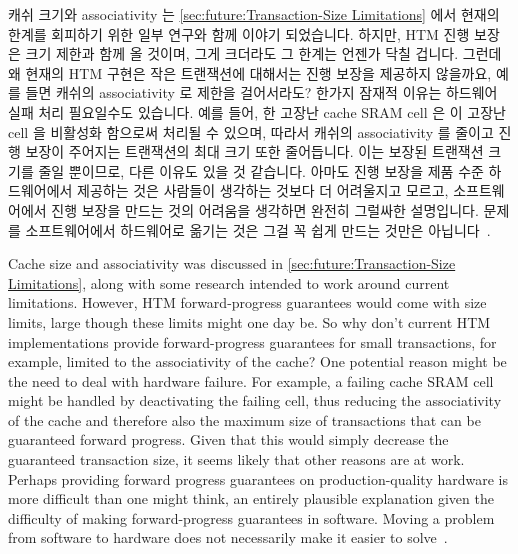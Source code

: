 \iffalse

As was discussed in
\cref{sec:future:Lack of Forward-Progress Guarantees},
current HTM implementations lack forward-progress guarantees, which requires
that fallback software is available to handle HTM failures.
Of course, it is easy to demand guarantees, but not always easy
to provide them.
In the case of HTM, obstacles to guarantees can include cache size and
associativity, TLB size and associativity, transaction duration and
interrupt frequency, and scheduler implementation.

\fi

캐쉬 크기와 associativity 는
\cref{sec:future:Transaction-Size Limitations}
에서 현재의 한계를 회피하기 위한 일부 연구와 함께 이야기 되었습니다.
하지만, HTM 진행 보장은 크기 제한과 함께 올 것이며, 그게 크더라도 그 한계는
언젠가 닥칠 겁니다.
그런데 왜 현재의 HTM 구현은 작은 트랜잭션에 대해서는 진행 보장을 제공하지
않을까요, 예를 들면 캐쉬의 associativity 로 제한을 걸어서라도?
한가지 잠재적 이유는 하드웨어 실패 처리 필요일수도 있습니다.
예를 들어, 한 고장난 cache SRAM cell 은 이 고장난 cell 을 비활성화 함으로써
처리될 수 있으며, 따라서 캐쉬의 associativity 를 줄이고 진행 보장이 주어지는
트랜잭션의 최대 크기 또한 줄어듭니다.
이는 보장된 트랜잭션 크기를 줄일 뿐이므로, 다른 이유도 있을 것 같습니다.
아마도 진행 보장을 제품 수준 하드웨어에서 제공하는 것은 사람들이 생각하는
것보다 더 어려울지고 모르고, 소프트웨어에서 진행 보장을 만드는 것의 어려움을
생각하면 완전히 그럴싸한 설명입니다.
문제를 소프트웨어에서 하드웨어로 옮기는 것은 그걸 꼭 쉽게 만드는 것만은
아닙니다~\cite{ChristianJacobi2012MainframeTM}.

\iffalse

Cache size and associativity was discussed in
\cref{sec:future:Transaction-Size Limitations},
along with some research intended to work around current limitations.
However, HTM forward-progress guarantees would
come with size limits, large though these limits might one day be.
So why don't current HTM implementations provide forward-progress
guarantees for small transactions, for example, limited to the
associativity of the cache?
One potential reason might be the need to deal with hardware failure.
For example, a failing cache SRAM cell might be handled by deactivating
the failing cell, thus reducing the associativity of the cache and
therefore also the maximum size of transactions that can be guaranteed
forward progress.
Given that this would simply decrease the guaranteed transaction size,
it seems likely that other reasons are at work.
Perhaps providing forward progress guarantees on production-quality
hardware is more difficult than one might think, an entirely plausible
explanation given the difficulty of making forward-progress guarantees
in software.
Moving a problem from software to hardware does not necessarily make
it easier to solve~\cite{ChristianJacobi2012MainframeTM}.

